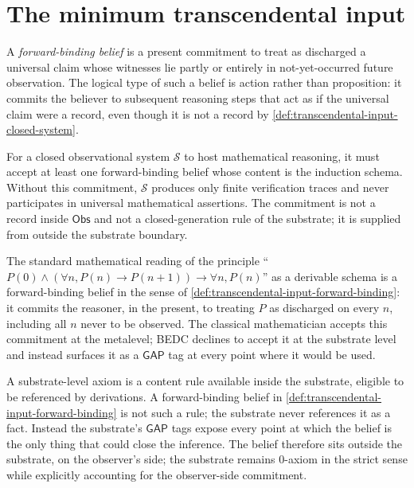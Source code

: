 \section{The minimum transcendental input}
\label{sec:transcendental-input-minimum}

\begin{definition}
\label{def:transcendental-input-forward-binding}
A \emph{forward-binding belief} is a present commitment to treat as discharged a universal claim whose witnesses lie partly or entirely in not-yet-occurred future observation. The logical type of such a belief is action rather than proposition: it commits the believer to subsequent reasoning steps that act as if the universal claim were a record, even though it is not a record by \autoref{def:transcendental-input-closed-system}.
\end{definition}

\begin{principle}
\label{prin:transcendental-input-minimum-necessity}
For a closed observational system $\mathcal{S}$ to host mathematical reasoning, it must accept at least one forward-binding belief whose content is the induction schema. Without this commitment, $\mathcal{S}$ produces only finite verification traces and never participates in universal mathematical assertions. The commitment is not a record inside $\mathsf{Obs}$ and not a closed-generation rule of the substrate; it is supplied from outside the substrate boundary.
\end{principle}

\begin{example}
\label{ex:transcendental-input-belief-in-induction}
The standard mathematical reading of the principle ``$P(0) \wedge (\forall n, P(n) \to P(n+1)) \to \forall n, P(n)$'' as a derivable schema is a forward-binding belief in the sense of \autoref{def:transcendental-input-forward-binding}: it commits the reasoner, in the present, to treating $P$ as discharged on every $n$, including all $n$ never to be observed. The classical mathematician accepts this commitment at the metalevel; BEDC declines to accept it at the substrate level and instead surfaces it as a $\mathsf{GAP}$ tag at every point where it would be used.
\end{example}

\begin{remark}
\label{rem:transcendental-input-not-axiom}
A substrate-level axiom is a content rule available inside the substrate, eligible to be referenced by derivations. A forward-binding belief in \autoref{def:transcendental-input-forward-binding} is not such a rule; the substrate never references it as a fact. Instead the substrate's $\mathsf{GAP}$ tags expose every point at which the belief is the only thing that could close the inference. The belief therefore sits outside the substrate, on the observer's side; the substrate remains 0-axiom in the strict sense while explicitly accounting for the observer-side commitment.
\end{remark}

